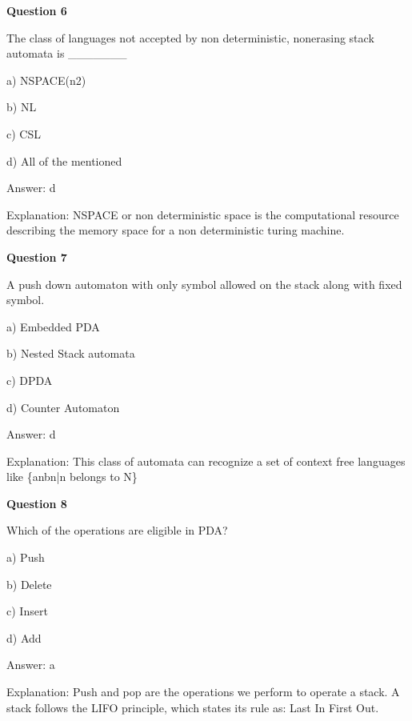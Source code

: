 \documentclass{article}
\begin{document}
\begin{mdframed}[linewidth=1pt, roundcorner=5pt, linecolor=gray!30, backgroundcolor=gray!5]
\textbf{Question 6} 

The class of languages  not accepted by non deterministic, nonerasing stack automata is \_\_\_\_\_\_\_

a) NSPACE(n2)

b) NL

c) CSL

d) All of the mentioned
\vspace{5pt} \par
\begin{tcolorbox}[colback=green!5, colframe=green!40!black, title=Solution]
Answer: d

Explanation: NSPACE or non deterministic space is the computational resource describing the memory space for a non deterministic turing machine.
\end{tcolorbox}
\end{mdframed}
\newpage

\begin{mdframed}[linewidth=1pt, roundcorner=5pt, linecolor=gray!30, backgroundcolor=gray!5]
\textbf{Question 7} 

A push down automaton with only symbol allowed on the stack along with fixed symbol.

a) Embedded PDA

b) Nested Stack automata

c) DPDA

d) Counter Automaton
\vspace{5pt} \par
\begin{tcolorbox}[colback=green!5, colframe=green!40!black, title=Solution]
Answer: d

Explanation: This class of automata can recognize a set of context free languages like \{anbn|n belongs to N\}
\end{tcolorbox}
\end{mdframed}

\begin{mdframed}[linewidth=1pt, roundcorner=5pt, linecolor=gray!30, backgroundcolor=gray!5]
\textbf{Question 8} 

Which of the operations are eligible in PDA?

a) Push

b) Delete

c) Insert

d) Add
\vspace{5pt} \par
\begin{tcolorbox}[colback=green!5, colframe=green!40!black, title=Solution]
Answer: a

Explanation: Push and pop are the operations we perform to operate a stack. A stack follows the LIFO principle, which states its rule as: Last In First Out.
\end{tcolorbox}
\end{mdframed}
\end{document}
